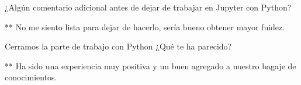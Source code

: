 \documentclass{article} %
\begin{document}
\vspace{0.5 cm}

¿Algún comentario adicional antes de dejar de trabajar en Jupyter con Python?

\vspace{0.5 cm}

** No me siento lista para dejar de hacerlo, sería bueno obtener mayor fuidez. 

\vspace{0.5 cm}

Cerramos la parte de trabajo con Python ¿Qué te ha parecido?

\vspace{0.5 cm}

** Ha sido una experiencia muy positiva y un buen agregado a nuestro bagaje de conocimientos. 
\end{document}
